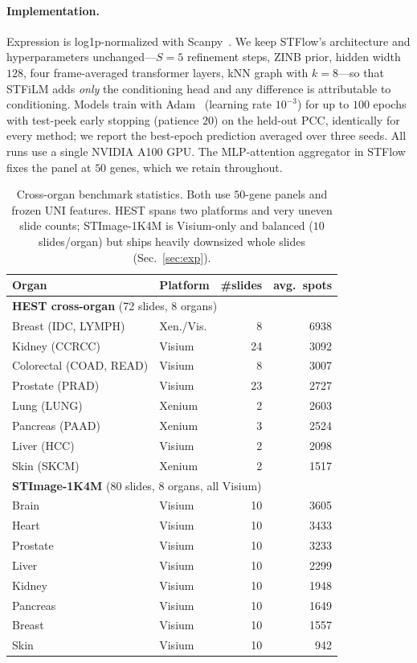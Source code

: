 \documentclass[10pt,twocolumn,letterpaper]{article}
\begin{document}
\paragraph{Implementation.} Expression is log1p-normalized with Scanpy~\cite{scanpy}. We keep
STFlow's architecture and hyperparameters unchanged---$S\!=\!5$ refinement steps, ZINB prior,
hidden width $128$, four frame-averaged transformer layers, kNN graph with $k\!=\!8$---so that
STFiLM adds \emph{only} the conditioning head and any difference is attributable to conditioning.
Models train with Adam~\cite{adam} (learning rate $10^{-3}$) for up to $100$ epochs with test-peek early
stopping (patience $20$) on the held-out PCC, identically for every method; we report the
best-epoch prediction averaged over three seeds. All runs use a single NVIDIA A100 GPU. The
MLP-attention aggregator in STFlow fixes the panel at $50$ genes, which we retain throughout.

\begin{table}[t]
\centering
\small
\setlength{\tabcolsep}{4pt}
\begin{tabular}{llrr}
\toprule
Organ & Platform & \#slides & avg.\ spots \\
\midrule
\multicolumn{4}{l}{\textbf{HEST cross-organ} (72 slides, 8 organs)} \\
\midrule
Breast (IDC, LYMPH) & Xen./Vis. & 8  & 6938 \\
Kidney (CCRCC)      & Visium    & 24 & 3092 \\
Colorectal (COAD, READ) & Visium & 8 & 3007 \\
Prostate (PRAD)     & Visium    & 23 & 2727 \\
Lung (LUNG)         & Xenium    & 2  & 2603 \\
Pancreas (PAAD)     & Xenium    & 3  & 2524 \\
Liver (HCC)         & Visium    & 2  & 2098 \\
Skin (SKCM)         & Xenium    & 2  & 1517 \\
\midrule
\multicolumn{4}{l}{\textbf{STImage-1K4M} (80 slides, 8 organs, all Visium)} \\
\midrule
Brain & Visium & 10 & 3605 \\
Heart & Visium & 10 & 3433 \\
Prostate & Visium & 10 & 3233 \\
Liver & Visium & 10 & 2299 \\
Kidney & Visium & 10 & 1948 \\
Pancreas & Visium & 10 & 1649 \\
Breast & Visium & 10 & 1557 \\
Skin & Visium & 10 & 942 \\
\bottomrule
\end{tabular}
\caption{Cross-organ benchmark statistics. Both use $50$-gene panels and frozen UNI features.
HEST spans two platforms and very uneven slide counts; STImage-1K4M is Visium-only and balanced
($10$ slides/organ) but ships heavily downsized whole slides (Sec.~\ref{sec:exp}).}
\label{tab:datasets}
\end{table}
\end{document}

